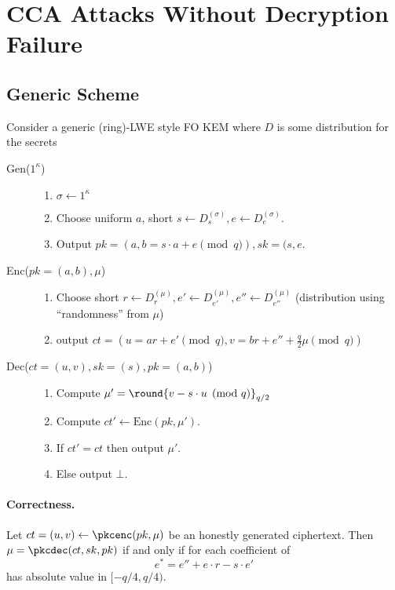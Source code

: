 \section{CCA Attacks Without Decryption Failure}
\label{sec:cca-no-failure}

\subsection{Generic Scheme}
\label{sec:gen-scheme}
Consider a generic (ring)-LWE style FO KEM where $D$ is some distribution
for the secrets 
\begin{description}
\item[Gen($1^{\kappa}$)] 
\begin{enumerate}
\item $\sigma \gets 1^{\kappa}$
\item Choose uniform $a$, short $s \gets D_{s}^{(\sigma)}, e \gets D_{e}^{(\sigma)}$.
\item Output $pk=(a, b=s\cdot a + e \pmod{q}), sk=(s,e$. 
\smallskip
\end{enumerate}
\item[Enc($pk=(a,b),\mu$)] 
\begin{enumerate}
\item Choose short $r \gets D^{(\mu)}_{r}, e' \gets D^{(\mu)}_{e'}, e'' \gets D^{(\mu)}_{e''}$
  (distribution using ``randomness'' from $\mu$)
\item output $ct=(u=ar+e' \pmod{q},v=br+e'' +\tfrac{q}{2}\mu\pmod{q})$
\end{enumerate}
\smallskip
\item[Dec($ct=(u,v),sk=(s),pk=(a,b)$)] 
\begin{enumerate}
\item Compute $\mu'=\round{v-s\cdot u\pmod{q}}_{q/2}$
\smallskip
\item Compute $ct'\gets\text{Enc}(pk,\mu')$.
\smallskip
\item If $ct'=ct$ then output $\mu'$.
\smallskip
\item Else output $\bot$. 
\end{enumerate}
\end{description}

\paragraph{Correctness.}

\begin{lemma}Let $ct=(u,v) \gets \pkcenc(pk,\mu)$ be an honestly generated
ciphertext. Then $\mu=\pkcdec(ct,sk,pk)$ if and only if for each
coefficient of 
\[e^*=e''+e\cdot r - s\cdot e'\] has absolute value in
$[-q/4,q/4)$. 
\end{lemma}

